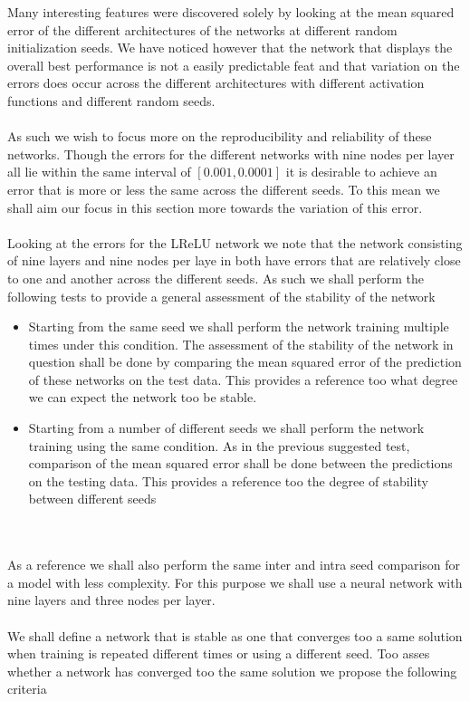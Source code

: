 \documentclass[]{article}
\begin{document}
Many interesting features were discovered solely by looking at the mean squared error of the different architectures of the networks at different random initialization seeds. We have noticed however that the network that displays the overall best performance is not a easily predictable feat and that variation on the errors does occur across the different architectures with different activation functions and different random seeds.
\\
\\
As such we wish to focus more on the reproducibility and reliability of these networks. Though the errors for the different networks with nine nodes per layer all lie within the same interval of $[0.001, 0.0001]$ it is desirable to achieve an error that is more or less the same across the different seeds. To this mean we shall aim our focus in this section more towards the variation of this error.
\\
\\
Looking at the errors for the LReLU network we note that the network consisting of nine layers and nine nodes per laye in both have errors that are relatively close to one and another across the different seeds. As such we shall perform the following tests to provide a general assessment of the stability of the network
\begin{itemize}
	\item Starting from the same seed we shall perform the network training multiple times under this condition. The assessment of the stability of the network in question shall be done by comparing the mean squared error of the prediction of these networks on the test data. This provides a reference too what degree we can expect the network too be stable.
	\item Starting from a number of different seeds we shall perform the network training using the same condition. As in the previous suggested test, comparison of the mean squared error shall be done between the predictions on the testing data. This provides a reference too the degree of stability between different seeds 
\end{itemize}
\\
\\
As a reference we shall also perform the same inter and intra seed comparison for a model with less complexity. For this purpose we shall use a neural network with nine layers and three nodes per layer.
\\
\\
We shall define a network that is stable as one that converges too a same solution when training is repeated different times or using a different seed. Too asses whether a network has converged too the same solution we propose the following criteria
\end{document}
